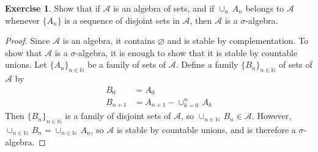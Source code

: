 \documentclass[11pt,a4paper,twoside]{article}
\theoremstyle{definition}
\newcounter{excounter}
\newtheorem{exercise}[excounter]{Exercise}
\begin{document}
\begin{exercise}

  Show that if $\mathscr{A}$ is an algebra of sets, and if $\cup_n \,A_n$ belongs to $\mathscr{A}$
  whenever $\{ A_n \}$ is a sequence of disjoint sets in $\mathscr{A}$, then $\mathscr{A}$ is a $\sigma$-algebra.

\end{exercise}

\begin{proof}

  Since $\mathscr{A}$ is an algebra, it contains $\varnothing$ and is stable by complementation. To show that
  $\mathscr{A}$ is a $\sigma$-algebra, it is enough to show that it is stable by countable unions.
  Let $\{ A_n \}_{n \in \mathbb{N}}$ be a family of sets of $\mathscr{A}$. Define a family $\{ B_n \}_{n \in \mathbb{N}}$
  of sets of $\mathscr{A}$ by
  \begin{align*}
    B_0 &= A_0 \\
    B_{n + 1} &= A_{n + 1} - \cup_{k = 0}^n \,A_k
  \end{align*}
  Then $\{ B_n \}_{n \in \mathbb{N}}$ is a family of disjoint sets of $\mathscr{A}$, so $\cup_{n \in \mathbb{N}} \,B_n \in \mathscr{A}$.
  However, $\cup_{n \in \mathbb{N}} \,B_n = \cup_{n \in \mathbb{N}} \,A_n$, so $\mathscr{A}$ is stable by countable unions,
  and is therefore a $\sigma$-algebra.

\end{proof}
\end{document}
